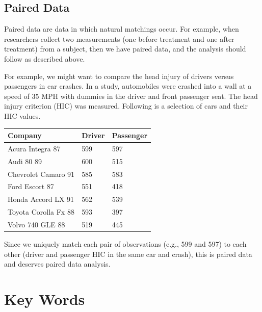 \documentclass[11pt, chapterprefix=true]{scrbook}\usepackage[]{graphicx}\usepackage[]{color}
\begin{document}
\subsection{Paired Data}

Paired data are data in which natural matchings occur.  For example, when researchers collect two measurements (one before treatment and one after treatment) from a subject, then we have paired data, and the analysis should follow as described above.  

For example, we might want to compare the head injury of drivers versus passengers in car crashes.   In a study, automobiles were crashed into a wall at a speed of 35 MPH with dummies in the driver and front passenger seat. The head injury criterion (HIC) was measured.  Following is a selection of cars and their HIC values.

\begin{table}[ht]
\centering
\begin{tabular}{@{} lll @{}} \hline
Company & Driver & Passenger \\ \hline
Acura Integra 87        &     		599   &      597 \\
Audi 80 89              &    		600    &     515 \\
Chevrolet Camaro 91     &    		585    &     583 \\
Ford Escort 87          &     		551   &      418 \\
Honda Accord LX 91      &     	562     &    539 \\
Toyota Corolla Fx 88    &    		593     &    397 \\
Volvo 740 GLE 88        &      		519   &      445 \\ \hline
\end{tabular}
\end{table}

Since we uniquely match each pair of observations (e.g., 599 and 597) to each other (driver and passenger HIC in the same car and crash), this is paired data and deserves paired data analysis.

\section{Key Words}

\end{document}

